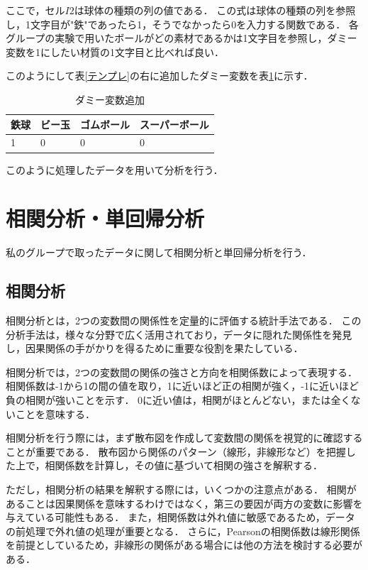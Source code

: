 \documentclass[titlepage,a4paper]{jsarticle}
\begin{document}
ここで，セル$I2$は球体の種類の列の値である．
この式は球体の種類の列を参照し，1文字目が"鉄"であったら1，そうでなかったら0を入力する関数である．
各グループの実験で用いたボールがどの素材であるかは1文字目を参照し，ダミー変数を1にしたい材質の1文字目と比べれば良い．

このようにして表\ref{テンプレ}の右に追加したダミー変数を表\ref{ダミー}に示す．
\begin{table}[H]
  \centering
  \caption{ダミー変数追加}
  \label{ダミー}
  \begin{tabular}{llll}
    鉄球 & ビー玉 & ゴムボール & スーパーボール \\\hline\hline
    1  & 0   & 0     & 0       \\\hline
  \end{tabular}
\end{table}

このように処理したデータを用いて分析を行う．


\section{相関分析・単回帰分析}\label{相関:節}
私のグループで取ったデータに関して相関分析と単回帰分析を行う．
\subsection{相関分析}
相関分析とは，2つの変数間の関係性を定量的に評価する統計手法である．
この分析手法は，様々な分野で広く活用されており，データに隠れた関係性を発見し，因果関係の手がかりを得るために重要な役割を果たしている．

相関分析では，2つの変数間の関係の強さと方向を相関係数によって表現する．
相関係数は-1から1の間の値を取り，1に近いほど正の相関が強く，-1に近いほど負の相関が強いことを示す．
0に近い値は，相関がほとんどない，または全くないことを意味する．

相関分析を行う際には，まず散布図を作成して変数間の関係を視覚的に確認することが重要である．
散布図から関係のパターン（線形，非線形など）を把握した上で，相関係数を計算し，その値に基づいて相関の強さを解釈する．

ただし，相関分析の結果を解釈する際には，いくつかの注意点がある．
相関があることは因果関係を意味するわけではなく，第三の要因が両方の変数に影響を与えている可能性もある．
また，相関係数は外れ値に敏感であるため，データの前処理で外れ値の処理が重要となる．
さらに，Pearsonの相関係数は線形関係を前提としているため，非線形の関係がある場合には他の方法を検討する必要がある．
\end{document}

